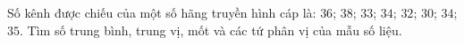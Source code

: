 \begin{ex}
Số kênh được chiếu của một số hãng truyền hình cáp là: $36$; $38$; $33$; $34$; $32$; $30$; $34$; $35$. Tìm số trung bình, trung vị, mốt và các tứ phân vị của mẫu số liệu.
\end{ex}
